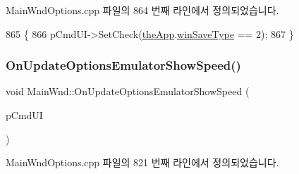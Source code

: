 Main\+Wnd\+Options.\+cpp 파일의 864 번째 라인에서 정의되었습니다.


\begin{DoxyCode}
865 \{
866   pCmdUI->SetCheck(\mbox{\hyperlink{_v_b_a_8cpp_a8095a9d06b37a7efe3723f3218ad8fb3}{theApp}}.\mbox{\hyperlink{class_v_b_a_a70060f88010280739406c87ef66d036a}{winSaveType}} == 2);
867 \}
\end{DoxyCode}
\mbox{\label{class_main_wnd_accdf36d9ca8700e9e49ecd1432de6c11}} 
\subsubsection{\texorpdfstring{On\+Update\+Options\+Emulator\+Show\+Speed()}{OnUpdateOptionsEmulatorShowSpeed()}}
{\footnotesize\ttfamily void Main\+Wnd\+::\+On\+Update\+Options\+Emulator\+Show\+Speed (\begin{DoxyParamCaption}\item[{C\+Cmd\+UI $\ast$}]{p\+Cmd\+UI }\end{DoxyParamCaption})}



Main\+Wnd\+Options.\+cpp 파일의 821 번째 라인에서 정의되었습니다.


